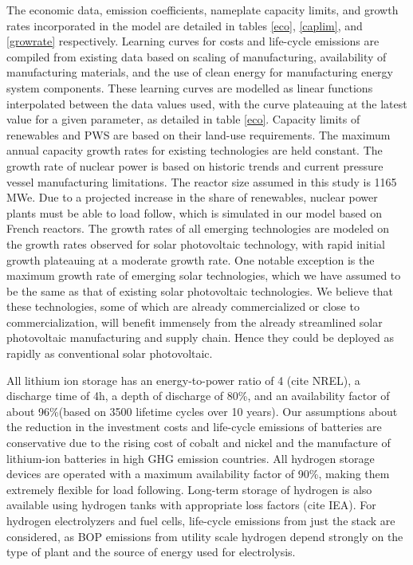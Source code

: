 The economic data, emission coefficients, nameplate capacity limits, and growth rates incorporated in the model are detailed in tables \ref{eco}, \ref{caplim}, and \ref{growrate} respectively. Learning curves for costs and life-cycle emissions are compiled from existing data based on scaling of manufacturing, availability of manufacturing materials, and the use of clean energy for manufacturing energy system components. These learning curves are modelled as linear functions interpolated between the data values used, with the curve plateauing at the latest value for a given parameter, as detailed in table \ref{eco}. Capacity limits of renewables and \gls{PWS} are based on their land-use requirements. The maximum annual capacity growth rates for existing technologies are held constant. The growth rate of nuclear power is based on historic trends and current pressure vessel manufacturing limitations. The reactor size assumed in this study is 1165 MWe. Due to a projected increase in the share of renewables, nuclear power plants must be able to load follow, which is simulated in our model based on French reactors. The growth rates of all emerging technologies are modeled on the growth rates observed for solar photovoltaic technology, with rapid initial growth plateauing at a moderate growth rate. One notable exception is the maximum growth rate of emerging solar technologies, which we have assumed to be the same as that of existing solar photovoltaic technologies. We believe that these technologies, some of which are already commercialized or close to commercialization, will benefit immensely from the already streamlined solar photovoltaic manufacturing and supply chain. Hence they could be deployed as rapidly as conventional solar photovoltaic. 

All lithium ion storage has an energy-to-power ratio of 4 (cite NREL), a discharge time of 4h, a depth of discharge of 80\%, and an availability factor of about 96\%(based on 3500 lifetime cycles over 10 years). Our assumptions about the reduction in the investment costs and life-cycle emissions of batteries are conservative due to the rising cost of cobalt and nickel and the manufacture of lithium-ion batteries in high \gls{GHG} emission countries. All hydrogen storage devices are operated with a maximum availability factor of 90\%, making them extremely flexible for load following. Long-term storage of hydrogen is also available using hydrogen tanks with appropriate loss factors (cite IEA). For hydrogen electrolyzers and fuel cells, life-cycle emissions from just the stack are considered, as \gls{BOP} emissions from utility scale hydrogen depend strongly on the type of plant and the source of energy used for electrolysis.


